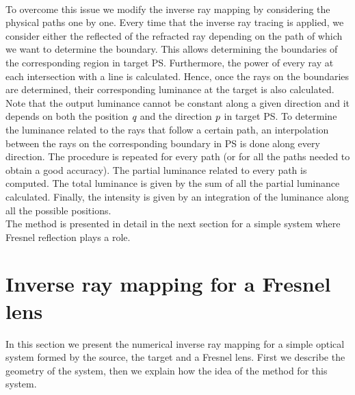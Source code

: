 \\ \indent To overcome this issue we modify the inverse ray mapping by considering the physical paths one by one. Every time that the inverse ray tracing is applied, we consider either the reflected of the refracted ray depending on the path of which we want to determine the boundary. This allows determining the boundaries of the corresponding region in target PS. Furthermore, the power of every ray at each intersection with a line is calculated. Hence, once the rays on the boundaries are determined, their corresponding luminance at the target is also calculated. Note that the output luminance cannot be constant along a given direction and it depends on both the position $\textit{q}$ and the direction $\textit{p}$ in target PS. To determine the luminance related to the rays that follow a certain path, an interpolation between the rays on the corresponding boundary in PS is done along every direction. The procedure is repeated for every path (or for all the paths needed to obtain a good accuracy). The partial luminance related to every path is computed.
The total luminance is given by the sum of all the partial luminance calculated.
Finally, the intensity is given by an integration of the luminance along all the possible positions.
\\ \indent
The method is presented in detail in the next section for a simple system where Fresnel reflection plays a role.
\section{Inverse ray mapping for a Fresnel lens}
In this section we present the numerical  inverse ray mapping for a simple optical system formed by the source, the target and a Fresnel lens.
First we describe the geometry of the system, then we explain how the idea of the method for this system.
